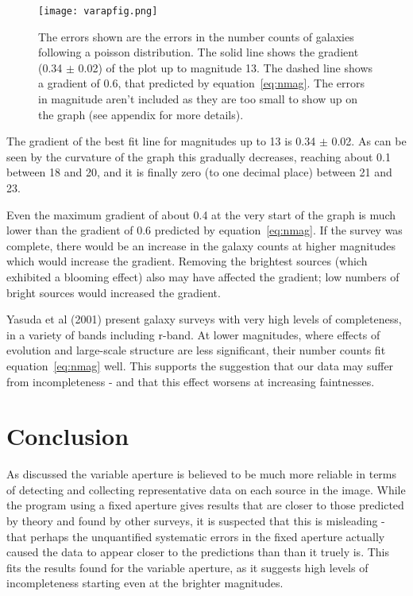 \documentclass[a4paper,11pt,twoside]{article}
\begin{document}
\begin{figure}[htb]
  \centering
  \texttt{[image: varapfig.png]}
  \caption{The errors shown are the errors in the number 
counts of galaxies following a poisson distribution. The solid line
shows the gradient (0.34 \(\pm\) 0.02) of the plot up to 
magnitude 13. The dashed line shows a gradient of 0.6, that 
predicted by equation~\ref{eq:nmag}. 
The errors in magnitude aren't included as 
they are too small to show up on the graph 
(see appendix for more details).}
  \label{fig:varapfig}
\end{figure}


The gradient of the best fit line for magnitudes up to 13 is 
0.34 \(\pm\) 0.02. As can be seen by the curvature of the 
graph this gradually decreases, reaching about 0.1 between 
18 and 20, and it is finally zero (to one decimal place) 
between 21 and 23. 

Even the maximum gradient of about 0.4 at the very start 
of the graph is much lower than the gradient of 0.6 
predicted by equation~\ref{eq:nmag}. If the survey was complete, 
there would be an increase in the galaxy counts at higher magnitudes 
which would increase the gradient. Removing the brightest 
sources (which exhibited a blooming effect) also may have 
affected the gradient; low numbers of bright sources would  
increased the gradient.

Yasuda\cite{yasuda} et al (2001) present galaxy surveys with 
very high levels of completeness, in a variety of bands including 
r-band. At lower magnitudes, where effects of evolution and 
large-scale structure are less significant, their number 
counts fit equation~\ref{eq:nmag} well. This supports the suggestion 
that our data may suffer from incompleteness - and that this 
effect worsens at increasing faintnesses. 

\section{Conclusion}

As discussed the variable aperture is believed to be much 
more reliable in terms of detecting and collecting 
representative data on each source in the image. 
While the program using a fixed aperture gives results that are 
closer to those predicted by theory and found by other surveys, 
it is suspected that this is misleading - that perhaps 
the unquantified systematic errors in the fixed aperture actually 
caused the data to appear closer to the predictions than 
than it truely is. This fits the results found for the variable 
aperture, as it suggests high levels of incompleteness 
starting even at the brighter magnitudes.
\end{document}
